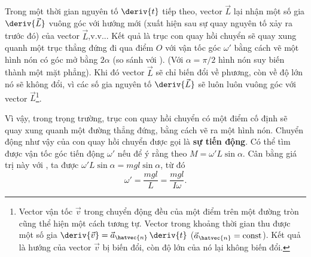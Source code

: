 Trong một thời gian nguyên tố $\deriv{t}$ tiếp theo, vector $\vec{L}$ lại nhận một số gia $\deriv{\vec{L}}$ vuông góc với hướng mới (xuất hiện sau sự quay nguyên tố xảy ra trước đó) của vector $\vec{L}$,v.v... Kết quả là trục con quay hồi chuyển sẽ quay xung quanh một trục thẳng đứng đi qua điểm $O$ với vận tốc góc $\omega'$ bằng cách vẽ một hình nón có góc mở bằng $2\alpha$ (so sánh với ). (Với $\alpha=\pi/2$ hình nón suy biến thành một mặt phẳng). Khi đó vector $\vec{L}$ sẽ chỉ biến đổi về phương, còn về độ lớn nó sẽ không đổi, vì các số gia nguyên tố $\deriv{\vec{L}}$ sẽ luôn luôn vuông góc với vector $\vec{L}$\footnote{Vector vận tốc $\vec{v}$ trong chuyển động đều của một điểm trên một đường tròn cũng thể hiện một cách tương tự. Vector trong khoảng thời gian thu được một số gia $\deriv{\vec{v}}=\vec{a}_{\hatvec{n}}\,\deriv{t}$ ($\vec{a}_{\hatvec{n}}=\text{const}$). Kết quả là hướng của vector $\vec{v}$ bị biến đổi, còn độ lớn của nó lại không biến đổi.}.

Vì vậy, trong trọng trường, trục con quay hồi chuyển có một điểm cố định sẽ quay xung quanh một đường thẳng đứng, bằng cách vẽ ra một hình nón. Chuyển động như vậy của con quay hồi chuyển được gọi là \textbf{sự tiến động}. Có thể tìm được vận tốc góc tiến động $\omega'$ nếu để ý rằng theo  $M=\omega'L\sin\alpha$. Cân bằng giá trị này với , ta được $\omega'L\sin\alpha=mgl\sin\alpha$, từ đó
\begin{equation}\label{eq:5_72}
	\omega' = \frac{mgl}{L} = \frac{mgl}{I\omega}.
\end{equation}

